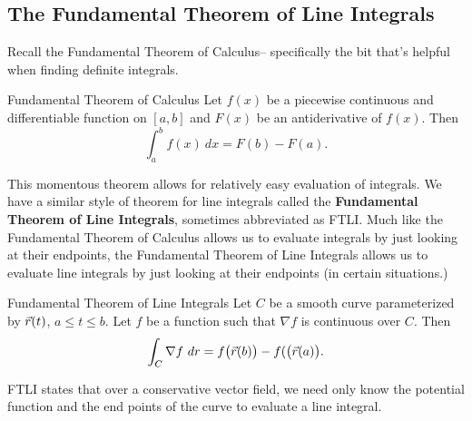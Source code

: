 \subsection{The Fundamental Theorem of Line Integrals}
Recall the Fundamental Theorem of Calculus-- specifically the bit that's helpful when finding definite integrals.

\begin{theorem}{Fundamental Theorem of Calculus}
Let $f(x)$ be a piecewise continuous and differentiable function on $[a,b]$ and $F(x)$ be an antiderivative of $f(x)$. Then $$\int_{a}^{b}f(x)\ dx=F(b)-F(a).$$
\end{theorem}

This momentous theorem allows for relatively easy evaluation of integrals. We have a similar style of theorem for line integrals called the \textbf{Fundamental Theorem of Line Integrals}, sometimes abbreviated as FTLI. Much like the Fundamental Theorem of Calculus allows us to evaluate integrals by just looking at their endpoints, the Fundamental Theorem of Line Integrals allows us to evaluate line integrals by just looking at their endpoints (in certain situations.)

\begin{theorem}{Fundamental Theorem of Line Integrals}
Let $C$ be a smooth curve parameterized by $\vec{r}(t)$, $a\leq t\leq b$. Let $f$ be a function such that $\nabla f$ is continuous over $C$. Then
$$\int_C \nabla f \ dr=f\big(\vcr(b)\big)-f(\big(\vcr(a)\big). $$
\end{theorem}

FTLI states that over a conservative vector field, we need only know the potential function and the end points of the curve to evaluate a line integral. 

